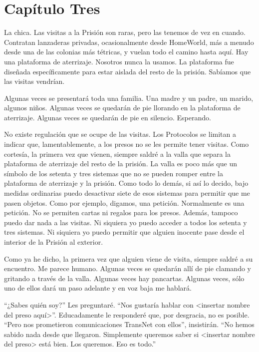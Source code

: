 \chapter*{Capítulo Tres}

La chica. Las visitas a la Prisión son raras, pero las tenemos de vez en
cuando. Contratan lanzaderas privadas, ocasionalmente desde HomeWorld,
más a menudo desde una de las colonias más tétricas, y vuelan todo el
camino hasta aquí. Hay una plataforma de aterrizaje. Nosotros nunca la
usamos. La plataforma fue diseñada específicamente para estar aislada
del resto de la prisión. Sabíamos que las visitas vendrían.

Algunas veces se presentará toda una familia. Una madre y un padre, un
marido, algunos niños. Algunas veces se quedarán de pie llorando en la
plataforma de aterrizaje. Algunas veces se quedarán de pie en silencio.
Esperando.

No existe regulación que se ocupe de las visitas. Los Protocolos se
limitan a indicar que, lamentablemente, a los presos no se les permite
tener visitas. Como cortesía, la primera vez que vienen, siempre saldré
a la valla que separa la plataforma de aterrizaje del resto de la
prisión. La valla es poco más que un símbolo de los setenta y tres
sistemas que no se pueden romper entre la plataforma de aterrizaje y la
prisión. Como todo lo demás, si así lo decido, bajo medidas ordinarias
puedo desactivar siete de esos sistemas para permitir que me pasen
objetos. Como por ejemplo, digamos, una petición. Normalmente es una
petición. No se permiten cartas ni regalos para los presos. Además,
tampoco puedo dar nada a las visitas. Ni siquiera yo puedo acceder a
todos los setenta y tres sistemas. Ni siquiera yo puedo permitir que
alguien inocente pase desde el interior de la Prisión al exterior.

Como ya he dicho, la primera vez que alguien viene de visita, siempre
saldré a su encuentro. Me parece humano. Algunas veces se quedarán allí
de pie clamando y gritando a través de la valla. Algunas veces hay
pancartas. Algunas veces, sólo uno de ellos dará un paso adelante y en
voz baja me hablará.

``¿Sabes quién soy?'' Les preguntaré. ``Nos gustaría hablar con
\textless{}insertar nombre del preso aquí\textgreater{}''. Educadamente
le responderé que, por desgracia, no es posible. ``Pero nos prometieron
comunicaciones TransNet con ellos'', insistirán. ``No hemos sabido nada
desde que llegaron. Simplemente queremos saber si \textless{}insertar
nombre del preso\textgreater{} está bien. Los queremos. Eso es todo.''

